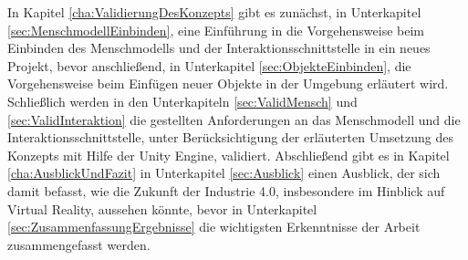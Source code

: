 \newline
In Kapitel \ref{cha:ValidierungDesKonzepts} gibt es zunächst, in Unterkapitel \ref{sec:MenschmodellEinbinden}, eine Einführung in die Vorgehensweise beim Einbinden des Menschmodells und der Interaktionsschnittstelle in ein neues Projekt, bevor anschließend, in Unterkapitel \ref{sec:ObjekteEinbinden}, die Vorgehensweise beim Einfügen neuer Objekte in der Umgebung erläutert wird. Schließlich werden in den Unterkapiteln \ref{sec:ValidMensch} und \ref{sec:ValidInteraktion} die gestellten Anforderungen an das Menschmodell und die Interaktionsschnittstelle, unter Berücksichtigung der erläuterten Umsetzung des Konzepts mit Hilfe der Unity Engine, validiert.
\newline
Abschließend gibt es in Kapitel \ref{cha:AusblickUndFazit} in Unterkapitel \ref{sec:Ausblick} einen Ausblick, der sich damit befasst, wie die Zukunft der Industrie 4.0, insbesondere im Hinblick auf Virtual Reality, aussehen könnte, bevor in Unterkapitel \ref{sec:ZusammenfassungErgebnisse} die wichtigsten Erkenntnisse der Arbeit zusammengefasst werden.

